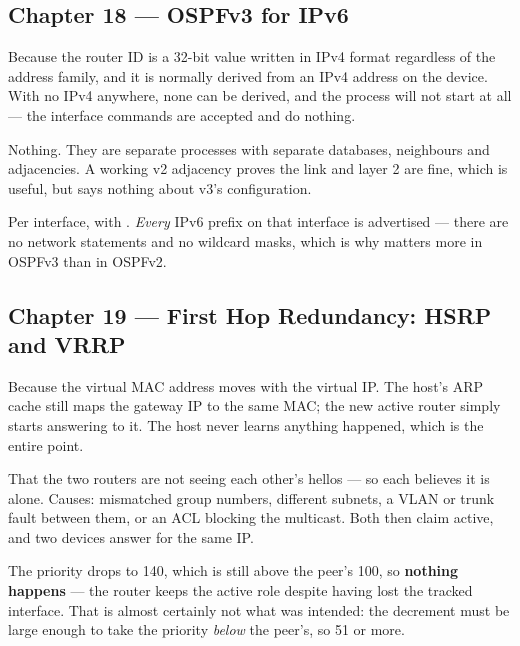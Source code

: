 \subsection*{Chapter 18 --- OSPFv3 for IPv6}
\begin{tightnum}
  \item Because the router ID is a 32-bit value written in IPv4 format regardless
        of the address family, and it is normally derived from an IPv4 address on
        the device. With no IPv4 anywhere, none can be derived, and the process
        will not start at all --- the interface commands are accepted and do
        nothing.
  \item Nothing. They are separate processes with separate databases, neighbours
        and adjacencies. A working v2 adjacency proves the link and layer 2 are
        fine, which is useful, but says nothing about v3's configuration.
  \item Per interface, with . \emph{Every} IPv6
        prefix on that interface is advertised --- there are no network statements
        and no wildcard masks, which is why  matters more
        in OSPFv3 than in OSPFv2.
\end{tightnum}

\subsection*{Chapter 19 --- First Hop Redundancy: HSRP and VRRP}
\begin{tightnum}
  \item Because the virtual MAC address moves with the virtual IP. The host's ARP
        cache still maps the gateway IP to the same MAC; the new active router
        simply starts answering to it. The host never learns anything happened,
        which is the entire point.
  \item That the two routers are not seeing each other's hellos --- so each
        believes it is alone. Causes: mismatched group numbers, different
        subnets, a VLAN or trunk fault between them, or an ACL blocking the
        multicast. Both then claim active, and two devices answer for the same IP.
  \item The priority drops to 140, which is still above the peer's 100, so
        \textbf{nothing happens} --- the router keeps the active role despite
        having lost the tracked interface. That is almost certainly not what was
        intended: the decrement must be large enough to take the priority
        \emph{below} the peer's, so 51 or more.
\end{tightnum}

